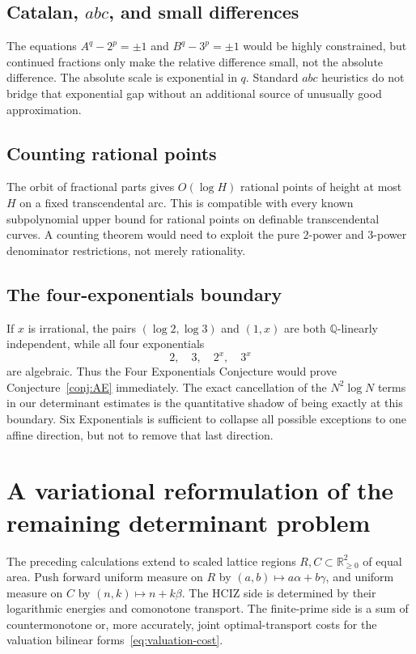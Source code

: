 \documentclass[11pt,oneside]{article}
\theoremstyle{definition}
\theoremstyle{remark}
\newcommand{\Q}{\mathbb Q}
\newcommand{\R}{\mathbb R}
\begin{document}
\subsection{Catalan, $abc$, and small differences}

The equations $A^q-2^p=\pm1$ and $B^q-3^p=\pm1$ would be highly constrained,
but continued fractions only make the relative difference small, not the
absolute difference.  The absolute scale is exponential in $q$.  Standard
$abc$ heuristics do not bridge that exponential gap without an additional
source of unusually good approximation.

\subsection{Counting rational points}

The orbit of fractional parts gives $O(\log H)$ rational points of height at
most $H$ on a fixed transcendental arc.  This is compatible with every known
subpolynomial upper bound for rational points on definable transcendental
curves.  A counting theorem would need to exploit the pure $2$-power and
$3$-power denominator restrictions, not merely rationality.

\subsection{The four-exponentials boundary}

If $x$ is irrational, the pairs $(\log2,\log3)$ and $(1,x)$ are both
$\Q$-linearly independent, while all four exponentials
\[
 2,\quad3,\quad2^x,\quad3^x
\]
are algebraic.  Thus the Four Exponentials Conjecture would prove
Conjecture~\ref{conj:AE} immediately.  The exact cancellation of the
$N^2\log N$ terms in our determinant estimates is the quantitative shadow of
being exactly at this boundary.  Six Exponentials is sufficient to collapse
all possible exceptions to one affine direction, but not to remove that last
direction.

\section{A variational reformulation of the remaining determinant problem}

The preceding calculations extend to scaled lattice regions
$R,C\subset\R_{\ge0}^2$ of equal area.  Push forward uniform measure on $R$ by
$(a,b)\mapsto a\alpha+b\gamma$, and uniform measure on $C$ by
$(n,k)\mapsto n+k\beta$.  The HCIZ side is determined by their logarithmic
energies and comonotone transport.  The finite-prime side is a sum of
countermonotone or, more accurately, joint optimal-transport costs for the
valuation bilinear forms~\eqref{eq:valuation-cost}.
\end{document}
